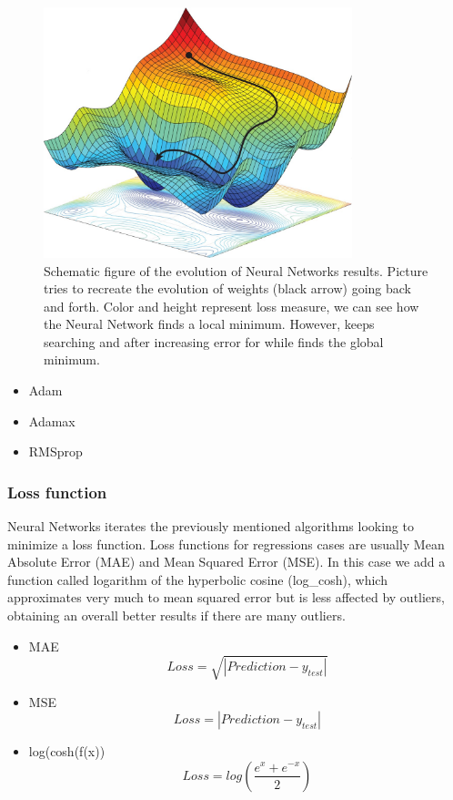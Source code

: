 \documentclass[openany]{article}
\begin{document}
\begin{figure}[!h]
    \centering
    \includegraphics[width=0.8\textwidth]{LRMinimun.png}
    \caption{Schematic figure of the evolution of Neural Networks results. Picture tries to recreate the evolution of weights (black arrow) going back and forth. Color and height represent loss measure, we can see how the Neural Network finds a local minimum. However, keeps searching and after increasing error for while finds the global minimum. }
    \label{ig:my_label}
\end{figure}

\begin{itemize}
    \item Adam
    
    \item Adamax
    
    \item RMSprop
    
\end{itemize}

\subsubsection*{Loss function}

Neural Networks iterates the previously mentioned algorithms looking to minimize a loss function. Loss functions for regressions cases are usually Mean Absolute Error (MAE) and Mean Squared Error (MSE). In this case we add a function called logarithm of the hyperbolic cosine (log\_cosh), which approximates very much to mean squared error but is less affected by outliers, obtaining an overall better results if there are many outliers.

\begin{itemize}
    \item MAE
    \begin{equation}
        Loss = \sqrt{|Prediction-y_{test}|}
    \end{equation}
    \item MSE
    \begin{equation}
        Loss = |Prediction-y_{test}|
    \end{equation}
    \item log(cosh(f(x))
    \begin{equation}
        Loss = log(\frac{e^x + e^{-x}}{2})
    \end{equation}
\end{itemize}
\end{document}

